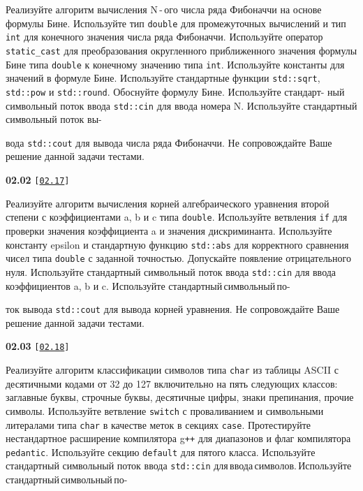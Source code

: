 \documentclass[a4paper,12pt]{article}
\begin{document}
\bigskip

Реализуйте алгоритм вычисления N\,-\,ого числа ряда Фибоначчи на основе формулы Бине. Используйте тип \lstinline{double} для промежуточных вычислений и тип \lstinline{int} для конечного значения числа ряда Фибоначчи. Используйте оператор \lstinline{static_cast} для преобразования округленного приближенного значения формулы Бине типа \lstinline{double} к конечному значению типа \lstinline{int}. Используйте константы для значений в формуле Бине. Используйте стандартные функции \lstinline{std::sqrt}, \lstinline{std::pow} и \lstinline{std::round}. Обоснуйте формулу Бине. Используйте стандарт- ный символьный поток ввода \lstinline{std::cin} для ввода номера N. Используйте стандартный символьный поток вы- 

вода \lstinline{std::cout} для вывода числа ряда Фибоначчи. Не сопровождайте Ваше решение данной задачи тестами.

\bigskip

{\large \textbf{02.02} \texttt{[\href{https://github.com/i-s-m-mipt/Education/blob/master/projects/examples/source/02.17.cpp}{\texttt{02.17}}]}}

\bigskip

Реализуйте алгоритм вычисления корней алгебраического уравнения второй степени с коэффициентами a, b и c типа \lstinline{double}. Используйте ветвления \lstinline{if} для проверки значения коэффициента a и значения дискриминанта. Используйте константу epsilon и стандартную функцию \lstinline{std::abs} для корректного сравнения чисел типа \lstinline{double} с заданной точностью. Допускайте появление отрицательного нуля. Используйте стандартный символьный поток ввода \lstinline{std::cin} для ввода коэффициентов a, b и c. Используйте стандартный\,символьный\,по- 

ток вывода \lstinline{std::cout} для вывода корней уравнения. Не сопровождайте Ваше решение данной задачи тестами.

\bigskip

{\large \textbf{02.03} \texttt{[\href{https://github.com/i-s-m-mipt/Education/blob/master/projects/examples/source/02.18.cpp}{\texttt{02.18}}]}}

\bigskip

Реализуйте алгоритм классификации символов типа \lstinline{char} из таблицы ASCII с десятичными кодами от 32 до 127 включительно на пять следующих классов: заглавные буквы, строчные буквы, десятичные цифры, знаки препинания, прочие символы. Используйте ветвление \lstinline{switch} с проваливанием и символьными литералами типа \lstinline{char} в качестве меток в секциях \lstinline{case}. Протестируйте нестандартное расширение компилятора g\texttt{++} для диапазонов и флаг компилятора \lstinline{pedantic}. Используйте секцию \lstinline{default} для пятого класса. Используйте стандартный символьный поток ввода \lstinline{std::cin} для\,ввода\,символов.\,Используйте\,стандартный\,символьный\,по- 
\end{document}
